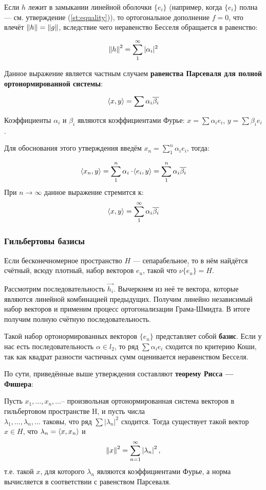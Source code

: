 \documentclass[12pt]{article}
\begin{document}
			Если $h$ лежит в замыкании линейной оболочки $\{ e_i \}$ (например, когда $\{ e_i \}$ полна --- см. утверждение (\ref{st:equality})), то ортогональное дополнение $f = 0$, что влечёт $\left\| h \right\| = \left\| g \right\|$, вследствие чего неравенство Бесселя обращается в равенство:

			$$\left\| h \right\|^2 = \sum_1^{\infty} |\alpha_i|^2$$

			Данное выражение является частным случаем \textbf{равенства Парсеваля для полной ортонормированной системы}:

			$$ \left\langle x, y \right\rangle = \sum \alpha_i \overline{\beta_i} $$

			Коэффициенты $\alpha_i$ и $\beta_i$ являются коэффициентами Фурье: $x = \sum \alpha_i e_i$, $y = \sum \beta_i e_i$.

			Для обоснования этого утверждения введём $x_n = \sum_1^n \alpha_i e_i$, тогда:

			$$ \left\langle x_n, y \right\rangle = \sum_1^n \alpha_i \cdot \! \left\langle e_i, y \right\rangle = \sum_1^n \alpha_i \overline{\beta_i}$$
			При $n \rightarrow \infty$ данное выражение стремится к:
			$$ \left\langle x, y \right\rangle = \sum_1^{\infty} \alpha_i \overline{\beta_i} $$

		\subsubsection{Гильбертовы базисы}

			Если бесконечномерное пространство $H$ --- сепарабельное, то в нём найдётся счётный, всюду плотный, набор векторов $e_u$, такой что $\overline{ \nu \{ e_u \} } = H$.

			Рассмотрим последовательность $\vec{h_i}$. Вычеркнем из неё те вектора, которые являются линейной комбинацией предыдущих.
			Получим линейно независимый набор векторов и применим процесс ортогонализации Грама-Шмидта. В итоге получим полную счётную 
			последовательность.

			Такой набор ортонормированных векторов $\{ e_u \}$ представляет собой \textbf{базис}. Если у нас
			есть последовательность $\alpha \in l_2$, то ряд $\sum \alpha_i e_i$ сходится по критерию Коши,
			так как квадрат разности частичных сумм оценивается неравенством Бесселя.

			По сути, приведённые выше утверждения составляют \textbf{теорему Рисса --- Фишера}:
			\begin{theorem}
				Пусть $x_1, \dots ,x_n, \dots $-- произвольная ортонормированная система векторов в гильбертовом пространстве H, и пусть 
				числа \\
				$\lambda _1, \dots ,\lambda _n, \dots $ таковы, что ряд $\sum |\lambda_n|^2$ сходится. Тогда существует такой 
				вектор $x\in H$, что $\lambda _n=\left\langle x, x_n \right\rangle$ и
				$$
					\left\| x \right\| ^2=\sum_{n=1}^{\infty } \left| \lambda_n \right|^2,
				$$
				т.е. такой $x$, для которого $\lambda_n$ являются коэффициентами Фурье, а норма вычисляется в 
				соответствии с равенством Парсеваля. 
			\end{theorem}
\end{document}
